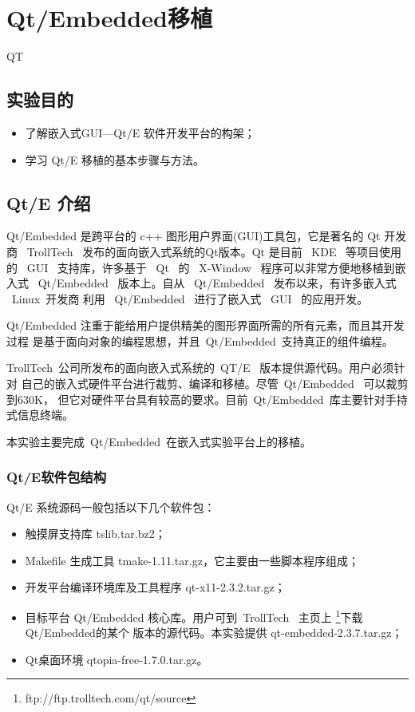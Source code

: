 \chapter{Qt/Embedded移植}{QT}

\section{实验目的}
\begin{itemize}\itemsep=-3pt
  \item 了解嵌入式GUI---Qt/E 软件开发平台的构架；
  \item 学习 Qt/E 移植的基本步骤与方法。
\end{itemize}

\section{Qt/E 介绍}
	Qt/Embedded 是跨平台的 c++ 图形用户界面(GUI)工具包，它是著名的 Qt 开发商
~TrollTech~ 发布的面向嵌入式系统的Qt版本。Qt 是目前 ~KDE~ 等项目使用的 ~GUI~
支持库，许多基于 ~Qt~ 的 ~X-Window~ 程序可以非常方便地移植到嵌入式
~Qt/Embedded~ 版本上。自从 ~Qt/Embedded~ 发布以来，有许多嵌入式 ~Linux~开发商
利用 ~Qt/Embedded~ 进行了嵌入式 ~GUI~ 的应用开发。

	Qt/Embedded 注重于能给用户提供精美的图形界面所需的所有元素，而且其开发过程
是基于面向对象的编程思想，并且~Qt/Embedded~支持真正的组件编程。

	TrollTech~公司所发布的面向嵌入式系统的~QT/E~ 版本提供源代码。用户必须针对
自己的嵌入式硬件平台进行裁剪、编译和移植。尽管~Qt/Embedded~ 可以裁剪到630K，
但它对硬件平台具有较高的要求。目前~Qt/Embedded~库主要针对手持式信息终端。

	本实验主要完成~Qt/Embedded~在嵌入式实验平台上的移植。
\subsection{Qt/E软件包结构}
	Qt/E 系统源码一般包括以下几个软件包：
\begin{itemize}\itemsep=-3pt
  \item 触摸屏支持库 tslib.tar.bz2；
  \item Makefile 生成工具 tmake-1.11.tar.gz，它主要由一些脚本程序组成；
  \item 开发平台编译环境库及工具程序 qt-x11-2.3.2.tar.gz；
  \item 目标平台 Qt/Embedded 核心库。用户可到~TrollTech~ 主页上
		\footnote{ftp://ftp.trolltech.com/qt/source}下载Qt/Embedded的某个
		版本的源代码。本实验提供 qt-embedded-2.3.7.tar.gz；
  \item Qt桌面环境 qtopia-free-1.7.0.tar.gz。
\end{itemize}

